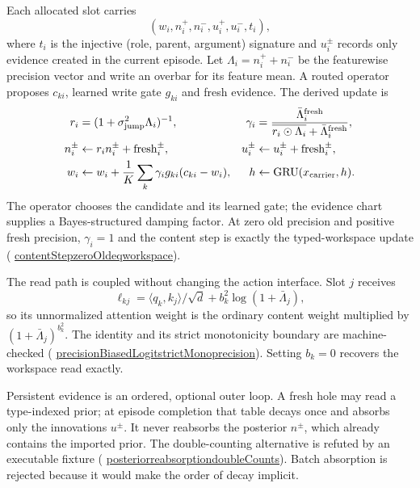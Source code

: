 \documentclass[11pt]{article}
\newcommand{\leanname}[1]{{\scriptsize\ttfamily
  \def\_{\textunderscore\allowbreak}#1}}
\newcommand{\formalcommit}{f3a31db36bb2f944312ee31c1d86c2758109e83a}
\newcommand{\leansource}[3]{%
  \href{https://github.com/zariuq/MeTTapedia/blob/\formalcommit/#1\#L#2}{\leanname{#3}}}
\begin{document}
Each allocated slot carries
\[
(w_i,n_i^+,n_i^-,u_i^+,u_i^-,t_i),
\]
where $t_i$ is the injective (role, parent, argument) signature and $u_i^\pm$ records
only evidence created in the current episode. Let
$\Lambda_i=n_i^++n_i^-$ be the featurewise precision vector and write an overbar for
its feature mean. A routed operator proposes $c_{ki}$, learned write gate $g_{ki}$ and
fresh evidence. The derived update is
\[
\begin{aligned}
r_i&=(1+\sigma_{\rm jump}^{2}\Lambda_i)^{-1},&
\gamma_i&=\frac{\bar\Lambda_i^{\rm fresh}}
  {\overline{r_i\odot\Lambda_i}+\bar\Lambda_i^{\rm fresh}},\\
n_i^\pm&\leftarrow r_i n_i^\pm+\mathrm{fresh}_i^\pm,&
u_i^\pm&\leftarrow u_i^\pm+\mathrm{fresh}_i^\pm,\\
w_i&\leftarrow w_i+\frac1K\sum_k
   \gamma_i g_{ki}(c_{ki}-w_i),&
h&\leftarrow\operatorname{GRU}(x_{\rm carrier},h).
\end{aligned}
\]
The operator chooses the candidate and its learned gate; the evidence chart supplies a
Bayes-structured damping factor. At zero old precision and positive fresh precision,
$\gamma_i=1$ and the content step is exactly the typed-workspace update
(\leansource{lean/mettapedia/Mettapedia/MachineLearning/NeuralNetworks/UnifiedCarrier/Core.lean}{114-L131}{contentStep\_zeroOld\_eq\_workspace}).

The read path is coupled without changing the action interface. Slot $j$ receives
\[
 \ell_{kj}=\langle q_k,k_j\rangle/\sqrt d+
 b_k^2\log(1+\bar\Lambda_j),
\]
so its unnormalized attention weight is the ordinary content weight multiplied by
$(1+\bar\Lambda_j)^{b_k^2}$. The identity and its strict monotonicity boundary are
machine-checked
(\leansource{lean/mettapedia/Mettapedia/MachineLearning/NeuralNetworks/UnifiedCarrier/Core.lean}{234-L270}{precisionBiasedLogit\_strictMono\_precision}).
Setting $b_k=0$ recovers the workspace read exactly.

Persistent evidence is an ordered, optional outer loop. A fresh hole may read a
type-indexed prior; at episode completion that table decays once and absorbs only the
innovations $u^\pm$. It never reabsorbs the posterior $n^\pm$, which already contains
the imported prior. The double-counting alternative is refuted by an executable fixture
(\leansource{lean/mettapedia/Mettapedia/MachineLearning/NeuralNetworks/UnifiedCarrier/Core.lean}{226-L231}{posterior\_reabsorption\_doubleCounts}).
Batch absorption is rejected because it would make the order of decay implicit.
\end{document}
